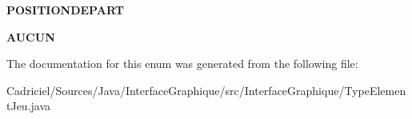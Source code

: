 \begin{DoxyCompactItemize}
\item 
\hypertarget{enum_interface_graphique_1_1_type_element_jeu_a24cfad1fba320366e456baa5e96ad9ca}{{\bfseries P\-O\-S\-I\-T\-I\-O\-N\-D\-E\-P\-A\-R\-T}}\label{enum_interface_graphique_1_1_type_element_jeu_a24cfad1fba320366e456baa5e96ad9ca}

\item 
\hypertarget{enum_interface_graphique_1_1_type_element_jeu_ab31eb3a5d91ab605a01683b52a9ae071}{{\bfseries A\-U\-C\-U\-N}}\label{enum_interface_graphique_1_1_type_element_jeu_ab31eb3a5d91ab605a01683b52a9ae071}

\end{DoxyCompactItemize}


The documentation for this enum was generated from the following file\-:\begin{DoxyCompactItemize}
\item 
Cadriciel/\-Sources/\-Java/\-Interface\-Graphique/src/\-Interface\-Graphique/Type\-Element\-Jeu.\-java\end{DoxyCompactItemize}
